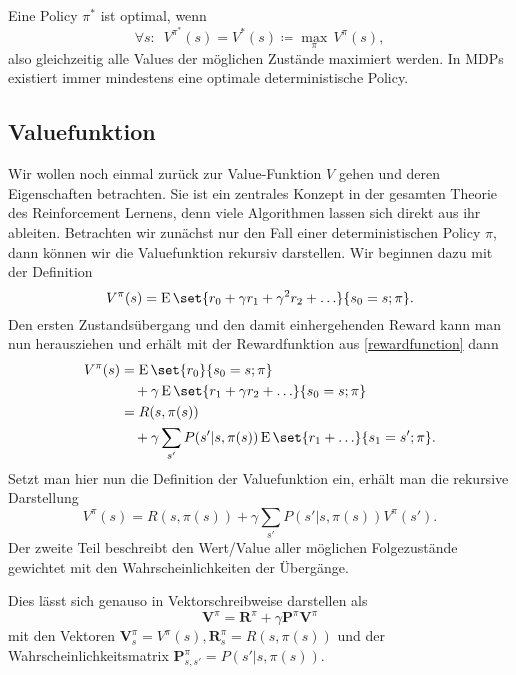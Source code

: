 Eine Policy $\pi^\ast$ ist optimal, wenn
\begin{equation*}
	\forall s:\enspace V^{\pi^\ast}(s)=V^\ast(s)\coloneqq\underset\pi\max\, V^\pi(s),
\end{equation*}
also gleichzeitig alle Values der möglichen Zustände maximiert werden.
In MDPs existiert immer mindestens eine optimale deterministische Policy.

\subsection{Valuefunktion}
Wir wollen noch einmal zurück zur Value-Funktion $V$ gehen und deren Eigenschaften betrachten. Sie ist ein zentrales Konzept in der gesamten Theorie des Reinforcement Lernens, denn viele Algorithmen lassen sich direkt aus ihr ableiten. Betrachten wir zunächst nur den Fall einer deterministischen Policy $\pi$, dann können wir die Valuefunktion rekursiv darstellen. Wir beginnen dazu mit der Definition
\begin{equation*}
	V^\pi(s)=\E\set{r_0+\gamma r_1+\gamma^2r_2+\ldots}{s_0=s;\pi}.
\end{equation*}
Den ersten Zustandsübergang und den damit einhergehenden Reward kann man nun herausziehen und erhält mit der Rewardfunktion aus \autoref{rewardfunction} dann
\begin{align*}
	V^\pi(s)&=\E\set{r_0}{s_0=s;\pi}\\
	&\quad+\gamma\E\set{r_1+\gamma r_2+\ldots}{s_0=s;\pi}\\
	&=R(s,\pi(s))\\
	&\quad+\gamma\sum_{s'}P(s'|s,\pi(s))\E\set{r_1+\ldots}{s_1=s';\pi}.
\end{align*}
Setzt man hier nun die Definition der Valuefunktion ein, erhält man die rekursive Darstellung
\begin{equation*}
	V^\pi(s)=R(s,\pi(s))+\gamma\sum_{s'}P(s'|s,\pi(s))V^\pi(s').
\end{equation*}
Der zweite Teil beschreibt den Wert/Value aller möglichen Folgezustände gewichtet mit den Wahrscheinlichkeiten der Übergänge.


Dies lässt sich genauso in Vektorschreibweise darstellen als
\begin{equation*}
	\mathbf V^\pi = \mathbf R^\pi+\gamma \mathbf P^\pi \mathbf V^\pi
\end{equation*}
mit den Vektoren $\mathbf V_s^\pi=V^\pi(s), \mathbf R_s^\pi=R(s,\pi(s))$ und der Wahrscheinlichkeitsmatrix $\mathbf P_{s,s'}^\pi=P(s'|s,\pi(s))$.

